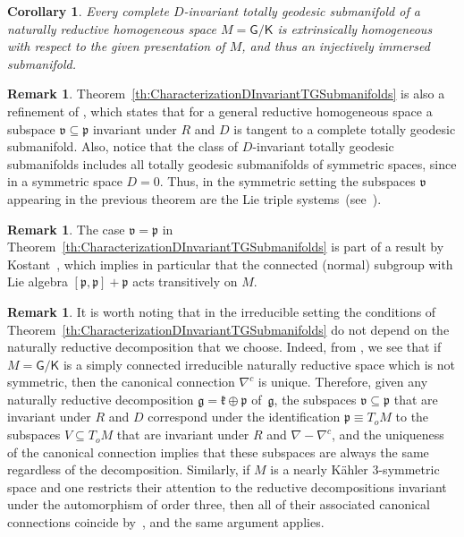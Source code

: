 \documentclass[11pt,a4paper,final]{amsart}
\newcommand{\s}{\mathsf}
\newcommand{\g}{\mathfrak}
\newtheorem{corollary}[theorem]{Corollary}
\theoremstyle{definition}
\newtheorem{remark}[theorem]{Remark}
\begin{document}
\begin{corollary}
	Every complete $D$-invariant totally geodesic submanifold of a naturally reductive homogeneous space $M=\s{G}/\s{K}$ is extrinsically homogeneous with respect to the given presentation of $M$, and thus an injectively immersed submanifold.
\end{corollary}

\begin{remark}
	Theorem~\ref{th:CharacterizationDInvariantTGSubmanifolds} is also a refinement of \cite[Lemma~3.1]{RodriguezVazquezOlmos}, which states that for a general reductive homogeneous space a subspace $\g{v}\subseteq \g{p}$ invariant under $R$ and $D$ is tangent to a complete totally geodesic submanifold.  Also, notice that the class of $D$-invariant totally geodesic submanifolds  includes all totally geodesic submanifolds of symmetric spaces, since in a symmetric space $D=0$.
    Thus, in the symmetric setting the subspaces $\g{v}$ appearing in the previous theorem are the Lie triple systems~(see~\cite[\S 11.1]{BerndtConsoleOlmos}).
\end{remark}

\begin{remark}
	The case $\g{v}=\g{p}$ in Theorem~\ref{th:CharacterizationDInvariantTGSubmanifolds} is part of a result by Kostant~\cite{Kostant}, which implies in particular that the connected (normal) subgroup with Lie algebra $[\g{p},\g{p}]+\g{p}$ acts transitively on $M$. 
\end{remark}


\begin{remark}
It is worth noting that in the irreducible setting the conditions of Theorem~\ref{th:CharacterizationDInvariantTGSubmanifolds} do not depend on the naturally reductive decomposition that we choose.
Indeed, from \cite[Theorem~2.1]{OlmosReggiani}, we see that if $M=\s{G}/\s{K}$ is a simply connected irreducible naturally reductive space which is not symmetric, then the canonical connection $\nabla^{c}$ is unique.
Therefore, given any naturally reductive decomposition $\g{g}=\g{k}\oplus\g{p}$ of~$\g{g}$, the subspaces $\g{v}\subseteq \g{p}$ that are invariant under $R$ and $D$ correspond under the identification $\g{p}\equiv T_{o}M$ to the subspaces $V\subseteq T_{o}M$ that are invariant under $R$ and $\nabla-\nabla^{c}$, and the uniqueness of the canonical connection implies that these subspaces are always the same regardless of the decomposition. 
Similarly, if $M$ is a nearly Kähler 3-symmetric space and one restricts their attention to the reductive decompositions invariant under the automorphism of order three, then all of their associated canonical connections coincide by~\cite[Lemma~3.1]{TojoLagrangian}, and the same argument applies.
\end{remark}
\end{document}
